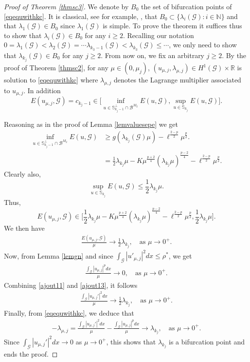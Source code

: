 \documentclass[10pt,a4paper]{article}
\theoremstyle{definition} \theoremstyle{remark}
\numberwithin{equation}{section}
\newcommand{\G}{\mathcal{G}}
\newcommand{\R}{\mathbb{R}}
\newcommand{\N}{\mathbb{N}}
\newcommand{\B}{\mathcal{B}}
\newcommand{\s}{\mathbb{S}}
\newcommand{\la}{\lambda}
\begin{document}
\begin{proof}[Proof of Theorem \ref{thmsc3}]
We denote by $B_0$ the set of bifurcation points of \eqref{eqequwithkc}. It is classical, see for example, \cite{CrRa}, that $B_0 \subset \{ \lambda_i(\G): i \in \N\}$ and that $\lambda_1(\G) \in B_0$ since $\lambda_1(\G)$ is simple. To prove the theorem it suffices thus to show that $\lambda_i(\G) \in B_0$ for any $i \geq 2$. Recalling our notation $0 =\lambda_1(\G) <\lambda_2(\G)= \cdots \la_{k_3 -1}(\G) < \la_{k_3}(\G) \leq \cdots $, we only need to show that $\la_{k_j}(\G)\in B_0$ for any $j \geq 2$. From now on, we fix an arbitrary $j \geq 2$. By the proof of Theorem \ref{thmsc2}, for any $\mu \in (0, \mu_j)$, $(u_{\mu ,j}, \la_{\mu, j}) \in H^1(\G) \times \R$ is solution to \eqref{eqequwithkc} where $\la_{\mu, j}$ denotes the Lagrange multiplier associated to $u_{\mu, j}$. In addition 
\begin{equation}
E(u_{\mu, j},\G) = c_{k_j-1}\in \Big[\inf_{u  \in\s_{k_j-1}^\perp \cap \B^{M_2}} E(u, \G), \sup_{u \in \s_{k_j}}E(u, \G)\Big].
\end{equation}


Reasoning as in the proof of Lemma \ref{lemvaluesepe} we get 
\begin{align} \label{ajout10}
		\inf_{u\in\s_{k_j -1}^\perp \cap \B^{M_2}}E(u,\G)
		& \geq g(\la_{k_j}(\G)\mu)- \ell^{\frac{2-p}2}\mu^\frac p2. \nonumber \\
		& =  \frac{1}{2}\la_{k_j} \mu - K \mu^{\frac{p+2}{4}}(\la_{k_j} \mu)^{\frac{p-2}{4}} - \ell^{\frac{2-p}2}\mu^\frac p2.
	\end{align}
	Clearly also,
	$$\sup_{u \in {\s_{k_j}}}E(u, \G) \leq \frac{1}{2}\la_{k_j}\mu.$$
	Thus,
	\begin{equation*}
E(u_{\mu, j},\G) \in \Big[\frac{1}{2}\la_{k_j} \mu - K \mu^{\frac{p+2}{4}}(\la_{k_j} \mu)^{\frac{p-2}{4}} - \ell^{\frac{2-p}2}\mu^\frac p2, \frac{1}{2}\la_{k_j}\mu \Big].
\end{equation*}
We then have
\begin{align}\label{ajout11}
\frac{E(u_{\mu, j}, \G)}{\mu} \to \frac{1}{2}\la_{k_j}, \quad \mbox{as } \mu \to 0^+.
\end{align}
Now, from Lemma \ref{lemgn} and since $\int_{\G}|u'_{\mu,j}|^2 dx \leq \rho^*$,  we get
\begin{align}\label{ajout13}
\frac{\int_{\G}|u_{\mu,j}|^p dx}{\mu} \to 0, \quad \mbox{as } \mu \to 0^+.
\end{align}
Combining \eqref{ajout11} and \eqref{ajout13}, it follows 
\begin{align*}
\frac{\int_{\G}|u_{\mu,j}'|^2dx}{\mu} \to \frac{1}{2}\la_{k_j}, \quad \mbox{as } \mu \to 0^+ .
\end{align*}
Finally, from \eqref{eqequwithkc}, we deduce that
\begin{align*}
-\la_{\mu, j} = \frac{\int_{\G}|u_{\mu,j}'|^2dx}{\mu} - \frac{\int_{\G}|u_{\mu,j}|^p dx}{\mu} \to \la_{k_j}, \quad \mbox{as } \mu \to 0^+.
\end{align*}
Since $\int_{\G}|u_{\mu,j}'|^2 dx \to 0$ as $\mu \to 0^+$, this shows that $\la_{k_j}$ is a bifurcation point and ends the proof.
\end{proof}
\end{document}
